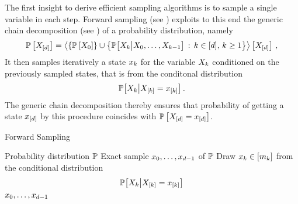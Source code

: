 
The first insight to derive efficient sampling algorithms is to sample a single variable in each step.
Forward sampling (see ) exploits to this end the generic chain decomposition (see ) of a probability distribution, namely
\begin{align*}
    \mathbb{P}\left[X_{[d]}\right] = \left\langle \{\mathbb{P}\left[X_{0}\right]\} \cup
    \left\{\mathbb{P}\big[X_{k}\big|X_{0},\ldots,X_{k-1}\big] \,:\, k\in[d] ,\, k\geq 1\right\}
    \right\rangle \left[ X_{[d]} \right] \, ,
\end{align*}
It then samples iteratively a state $x_{k}$ for the variable $X_{k}$ conditioned on the previously sampled states, that is from the conditonal distribution
\begin{align*}
    \mathbb{P}\big[X_{k}\big|X_{[k]}=x_{[k]}\big] \, .
\end{align*}
The generic chain decomposition thereby ensures that probability of getting a state $x_{[d]}$ by this procedure coincides with $\mathbb{P}\left[X_{[d]}=x_{[d]}\right]$.

\begin{algorithm}[hbt!]
    \caption{Forward Sampling}\label{alg:ForwardSampling}
    \begin{algorithmic}
        \Require Probability distribution $\mathbb{P}$
        \Ensure Exact sample $x_{0},\ldots,x_{d-1}$ of $\mathbb{P}$
    \iosepline
        \ForAll{$\catenumeratorin$}
            \State Draw $x_{k}\in[m_{k}]$ from the conditional distribution
            \begin{align*}
                \mathbb{P}\big[X_{k}\big|X_{[k]}=x_{[k]}\big]
            \end{align*}
        \EndFor
        \State \Return $x_{0},\ldots,x_{d-1}$
    \end{algorithmic}
\end{algorithm}

